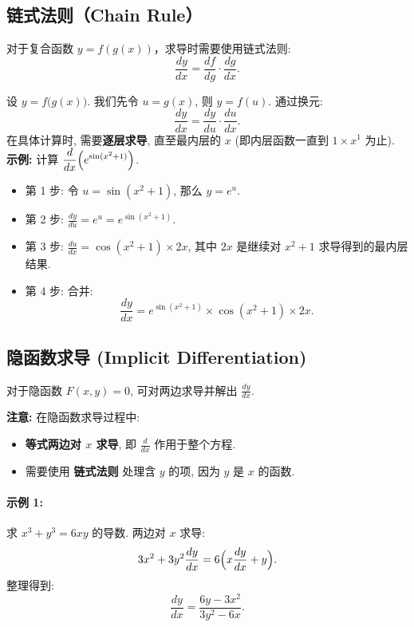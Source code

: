 \documentclass[8pt,a4paper,twoside]{tau-class/tau}
\begin{document}
\subsection{链式法则（Chain Rule）}
对于复合函数 $y = f(g(x))$，求导时需要使用链式法则:
\[
    \frac{dy}{dx} = \frac{df}{dg} \cdot \frac{dg}{dx}.
\]

\begin{tcolorbox}[enhanced, breakable, boxsep=1pt, colframe=blue!50!black, colback=white, fonttitle=\footnotesize, fontupper=\footnotesize, title=链式法则: 换元法解释]
\noindent
设 $y = f\bigl(g(x)\bigr)$. 我们先令 $u = g(x)$, 则 $y = f(u)$. 通过换元:
\[
    \frac{dy}{dx} = \frac{dy}{du} \cdot \frac{du}{dx}.
\]
在具体计算时, 需要\textbf{逐层求导}, 直至最内层的 $x$ (即内层函数一直到 $1× x^1$ 为止).\\
\textbf{示例:} 计算 $\displaystyle \frac{d}{dx} \Bigl(e^{\sin (x^2 + 1)}\Bigr)$.\newline
\begin{itemize}
    \item 第 1 步: 令 $u = \sin (x^2 + 1)$, 那么 $y = e^u$.
    \item 第 2 步: $\displaystyle \frac{dy}{du} = e^u = e^{\sin(x^2+1)}$.
    \item 第 3 步: $\displaystyle \frac{du}{dx} = \cos(x^2 + 1) × 2x$, 其中 $2x$ 是继续对 $x^2 + 1$ 求导得到的最内层结果.
    \item 第 4 步: 合并:
    \[
        \frac{dy}{dx} = e^{\sin(x^2 + 1)} × \cos(x^2 + 1) × 2x.
    \]
\end{itemize}
\end{tcolorbox}

\subsection{隐函数求导 (Implicit Differentiation)}
对于隐函数 $F(x,y) = 0$, 可对两边求导并解出 $\tfrac{dy}{dx}$.

\textbf{注意:} 在隐函数求导过程中:
\begin{itemize}
  \item \textbf{等式两边对 $x$ 求导}, 即 $\tfrac{d}{dx}$ 作用于整个方程.
  \item 需要使用 \textbf{链式法则} 处理含 $y$ 的项, 因为 $y$ 是 $x$ 的函数.
\end{itemize}

\paragraph{示例 1:} 求 $x^3 + y^3 = 6xy$ 的导数.
两边对 $x$ 求导:
\[
    3x^2 + 3y^2 \frac{dy}{dx} = 6 \Bigl( x \frac{dy}{dx} + y \Bigr).
\]
整理得到:
\[
    \frac{dy}{dx} = \frac{6y − 3x^2}{3y^2 − 6x}.
\]
\end{document}
